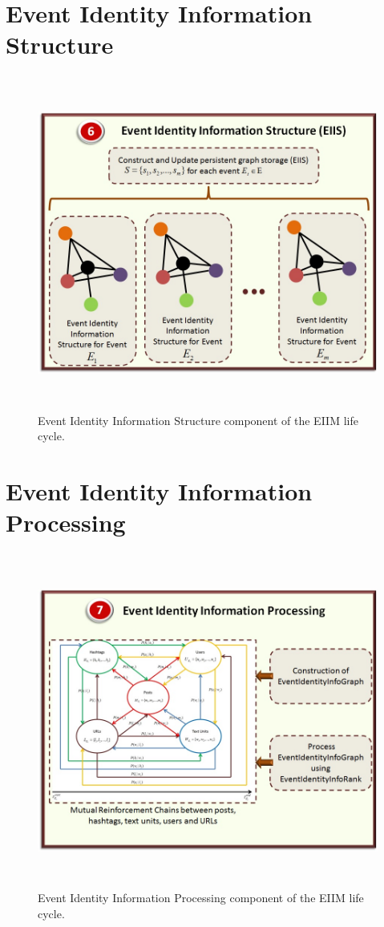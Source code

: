 \section{Event Identity Information Structure}

\begin{figure}[htbp]
  \caption{Event Identity Information Structure component of the EIIM life cycle.}
  \centering
    \includegraphics[width=14cm,height=11cm]{Figures/EIIMComponents/EventIdentityInformationStructure.jpg}
\end{figure}



\section{Event Identity Information Processing\label{EventIdentityInformationProcessing}}

\begin{figure}[htbp]
  \caption{Event Identity Information Processing component of the EIIM life cycle.}
  \centering
    \includegraphics[width=14cm,height=11cm]{Figures/EIIMComponents/EventIdentityInformationProcessing.jpg}
\end{figure}


